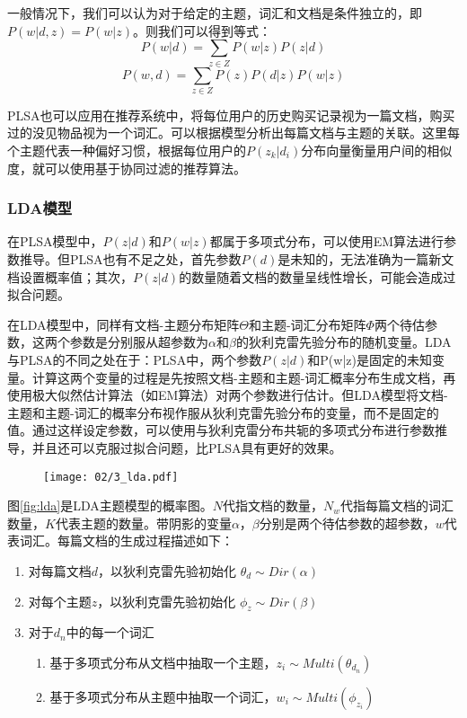 一般情况下，我们可以认为对于给定的主题，词汇和文档是条件独立的，即$P(w|d,z) = P(w|z)$。则我们可以得到等式：
\begin{equation}
	P(w|d) = \sum_{z\in Z}P(w|z)P(z|d)
\end{equation}
\begin{equation}
	P(w,d) = \sum_{z\in Z}P(z)P(d|z)P(w|z)
\end{equation}

PLSA也可以应用在推荐系统中，将每位用户的历史购买记录视为一篇文档，购买过的没见物品视为一个词汇。可以根据模型分析出每篇文档与主题的关联。这里每个主题代表一种偏好习惯，根据每位用户的$P(z_k|d_i)$分布向量衡量用户间的相似度，就可以使用基于协同过滤的推荐算法。

\subsubsection{LDA模型}


在PLSA模型中，$P(z|d)$和$P(w|z)$都属于多项式分布，可以使用EM算法进行参数推导。但PLSA也有不足之处，首先参数$P(d)$是未知的，无法准确为一篇新文档设置概率值；其次，$P(z|d)$的数量随着文档的数量呈线性增长，可能会造成过拟合问题。

在LDA\cite{blei2003latent}模型中，同样有文档-主题分布矩阵$\Theta$和主题-词汇分布矩阵$\Phi$两个待估参数，这两个参数是分别服从超参数为$\alpha$和$\beta$的狄利克雷先验分布的随机变量。LDA与PLSA的不同之处在于：PLSA中，两个参数$P(z|d)$和P(w|z)是固定的未知变量。计算这两个变量的过程是先按照文档-主题和主题-词汇概率分布生成文档，再使用极大似然估计算法（如EM算法）对两个参数进行估计。但LDA模型将文档-主题和主题-词汇的概率分布视作服从狄利克雷先验分布的变量，而不是固定的值。通过这样设定参数，可以使用与狄利克雷分布共轭的多项式分布进行参数推导，并且还可以克服过拟合问题，比PLSA具有更好的效果。

\begin{figure}[!h]
 \centering
 \texttt{[image: 02/3\_lda.pdf]}
\end{figure}

图\ref{fig:lda}是LDA主题模型的概率图。$N$代指文档的数量，$N_w$代指每篇文档的词汇数量，$K$代表主题的数量。带阴影的变量$\alpha$，$\beta$分别是两个待估参数的超参数，$w$代表词汇。每篇文档的生成过程描述如下：

\begin{enumerate}
\item 对每篇文档$d$，以狄利克雷先验初始化 $\theta_d \sim Dir(\alpha)$
\item 对每个主题$z$，以狄利克雷先验初始化 $\phi_z \sim Dir(\beta)$
\item 对于$d_n$中的每一个词汇
       \begin{enumerate}[fullwidth,itemindent=1em,label=(\alph*)]
       \item 基于多项式分布从文档中抽取一个主题，$z_i \sim Multi(\theta_{d_n})$
       \item 基于多项式分布从主题中抽取一个词汇，$w_i \sim Multi(\phi_{z_i})$
       \end{enumerate}
\end{enumerate}

